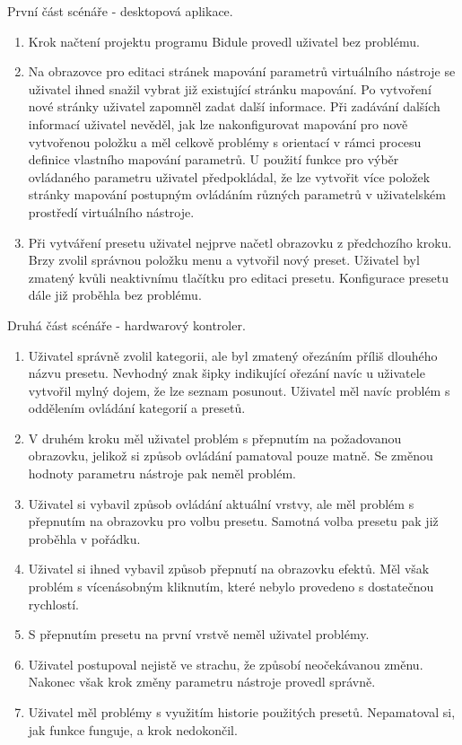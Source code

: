 \documentclass[thesis=M,czech]{FITthesis}[2019/03/06]
\begin{document}
				\noindent
				První část scénáře - desktopová aplikace.
				\begin{enumerate}
					\item Krok načtení projektu programu Bidule provedl uživatel bez problému.
					
					\item Na obrazovce pro editaci stránek mapování parametrů virtuálního nástroje se uživatel ihned snažil vybrat již existující stránku mapování. Po vytvoření nové stránky uživatel zapomněl zadat další informace. Při zadávání dalších informací uživatel nevěděl, jak lze nakonfigurovat mapování pro nově vytvořenou položku a měl celkově problémy s orientací v rámci procesu definice vlastního  mapování parametrů.	U použití funkce pro výběr ovládaného parametru uživatel předpokládal, že lze vytvořit více položek stránky mapování postupným ovládáním různých parametrů v uživatelském prostředí virtuálního nástroje.
					
					\item Při vytváření presetu uživatel nejprve načetl obrazovku z předchozího kroku. Brzy zvolil správnou položku menu a vytvořil nový preset. Uživatel byl zmatený kvůli neaktivnímu tlačítku pro editaci presetu. Konfigurace presetu dále již proběhla bez problému.
				\end{enumerate}
				
				\noindent
				Druhá část scénáře - hardwarový kontroler.
				\begin{enumerate}
					\item Uživatel správně zvolil kategorii, ale byl zmatený ořezáním příliš dlouhého názvu presetu. Nevhodný znak šipky indikující ořezání navíc u uživatele vytvořil mylný dojem, že lze seznam posunout. Uživatel měl navíc problém s oddělením ovládání kategorií a presetů.
					\item V druhém kroku měl uživatel problém s přepnutím na požadovanou obrazovku, jelikož si způsob ovládání pamatoval pouze matně. Se změnou hodnoty parametru nástroje pak neměl problém. 
					\item Uživatel si vybavil způsob ovládání aktuální vrstvy, ale měl problém s přepnutím na obrazovku pro volbu presetu. Samotná volba presetu pak již proběhla v pořádku.
					\item Uživatel si ihned vybavil způsob přepnutí na obrazovku efektů. Měl však problém s vícenásobným kliknutím, které nebylo provedeno s dostatečnou rychlostí.
					\item S přepnutím presetu na první vrstvě neměl uživatel problémy.
					\item Uživatel postupoval nejistě ve strachu, že způsobí neočekávanou změnu. Nakonec však krok změny parametru nástroje provedl správně.
					\item Uživatel měl problémy s využitím historie použitých presetů. Nepamatoval si, jak funkce funguje, a krok nedokončil.
				\end{enumerate}
			
\end{document}
